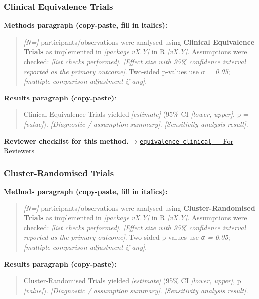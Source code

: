 \documentclass[
]{article}
\begin{document}
\subsubsection{Clinical Equivalence
Trials}\label{clinical-equivalence-trials}

\textbf{Methods paragraph (copy-paste, fill in italics):}

\begin{quote}
\emph{{[}N={]}} participants/observations were analysed using
\textbf{Clinical Equivalence Trials} as implemented in \emph{{[}package
vX.Y{]}} in R \emph{{[}vX.Y{]}}. Assumptions were checked: \emph{{[}list
checks performed{]}}. \emph{{[}Effect size with 95\% confidence interval
reported as the primary outcome{]}}. Two-sided p-values use \emph{α =
0.05}; \emph{{[}multiple-comparison adjustment if any{]}}.
\end{quote}

\textbf{Results paragraph (copy-paste):}

\begin{quote}
Clinical Equivalence Trials yielded \emph{{[}estimate{]}} (95\% CI
\emph{{[}lower, upper{]}}, p = \emph{{[}value{]}}). \emph{{[}Diagnostic
/ assumption summary{]}}. \emph{{[}Sensitivity analysis result{]}}.
\end{quote}

\textbf{Reviewer checklist for this method.} →
\href{../chapters/14-clinical/equivalence-clinical.Rmd\#for-reviewers}{\texttt{equivalence-clinical}
--- For Reviewers}

\subsubsection{Cluster-Randomised
Trials}\label{cluster-randomised-trials}

\textbf{Methods paragraph (copy-paste, fill in italics):}

\begin{quote}
\emph{{[}N={]}} participants/observations were analysed using
\textbf{Cluster-Randomised Trials} as implemented in \emph{{[}package
vX.Y{]}} in R \emph{{[}vX.Y{]}}. Assumptions were checked: \emph{{[}list
checks performed{]}}. \emph{{[}Effect size with 95\% confidence interval
reported as the primary outcome{]}}. Two-sided p-values use \emph{α =
0.05}; \emph{{[}multiple-comparison adjustment if any{]}}.
\end{quote}

\textbf{Results paragraph (copy-paste):}

\begin{quote}
Cluster-Randomised Trials yielded \emph{{[}estimate{]}} (95\% CI
\emph{{[}lower, upper{]}}, p = \emph{{[}value{]}}). \emph{{[}Diagnostic
/ assumption summary{]}}. \emph{{[}Sensitivity analysis result{]}}.
\end{quote}
\end{document}
